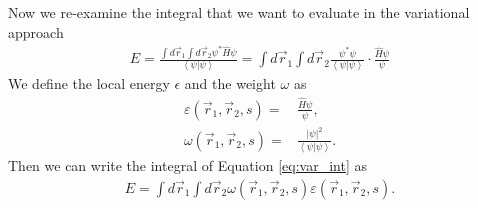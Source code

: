 Now we re-examine the integral that we want to evaluate in the variational approach
\begin{align}
E = \frac{{\int {d{{\vec r}_1}\int {d{{\vec r}_2}} {\psi ^ * }\hat H\psi } }}{{\left\langle \psi  \right|\left. \psi  \right\rangle }} = \int {d{{\vec r}_1}\int {d{{\vec r}_2}} \frac{{{\psi ^ * }\psi }}{{\left\langle \psi  \right|\left. \psi  \right\rangle }} \cdot \frac{{\hat H\psi }}{\psi }}
\label{eq:var_int}
\end{align}
We define the local energy $\epsilon$ and the weight $\omega$ as
\begin{align}
\varepsilon \left( {{{\vec r}_1},{{\vec r}_2},s} \right) =& \frac{{\hat H\psi }}{\psi },\\
\omega \left( {{{\vec r}_1},{{\vec r}_2},s} \right) =& \frac{{{{\left| \psi  \right|}^2}}}{{\left\langle \psi  \right|\left. \psi  \right\rangle }}.
\end{align}
Then we can write the integral of Equation \ref{eq:var_int} as 
\begin{align}
E = \int {d{{\vec r}_1}\int {d{{\vec r}_2}} \omega \left( {{{\vec r}_1},{{\vec r}_2},s} \right)\varepsilon \left( {{{\vec r}_1},{{\vec r}_2},s} \right)}.
\end{align}